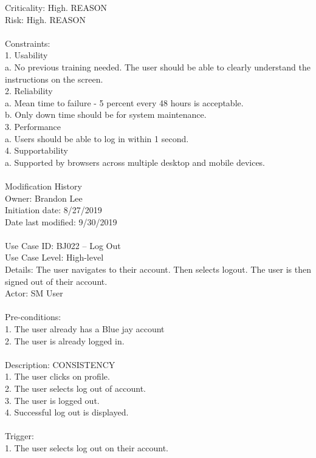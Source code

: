 \documentclass{report}
\begin{document}
     Criticality: High. REASON\\
     Risk: High. REASON\\
     \\
Constraints: \\
1. Usability\\
a.	 No previous training needed. The user should be able to clearly understand the instructions on the screen.\\
2. Reliability\\
a.	Mean time to failure - 5 percent every 48 hours is acceptable.\\
b.	Only down time should be for system maintenance.\\
3. Performance\\
a.	Users should be able to log in within 1 second.\\
4. Supportability\\
a.	Supported by browsers across multiple desktop and mobile devices.\\
\\
Modification History\\
     Owner: Brandon Lee\\
     Initiation date: 8/27/2019\\
     Date last modified: 9/30/2019\\
\\
Use Case ID: BJ022 – Log Out\\
Use Case Level: High-level\\
Details:  The user navigates to their account. Then selects logout. The user is then signed out of their account.\\
Actor: SM User\\
\\
Pre-conditions: \\
1.	The user already has a Blue jay account\\
2.	The user is already logged in.\\
\\
Description: CONSISTENCY\\
1.	The user clicks on profile.\\
2.	The user selects log out of account.\\
3.	The user is logged out.\\
4.	Successful log out is displayed.\\
\\
Trigger: \\
1.	The user selects log out on their account.\\
\end{document}
